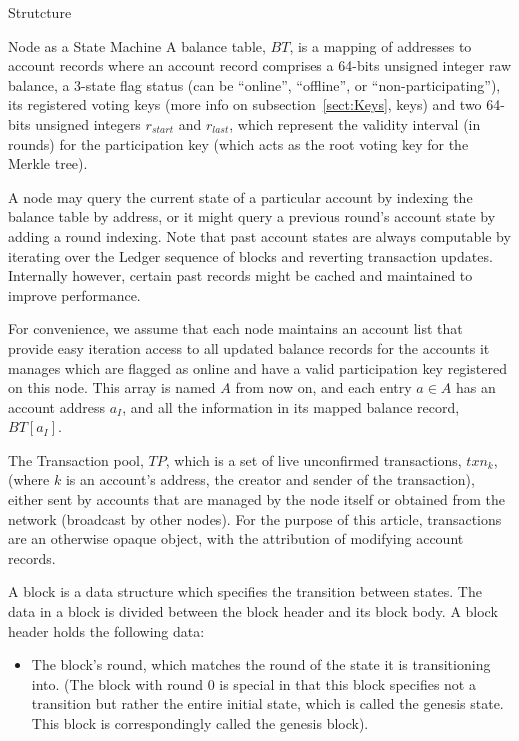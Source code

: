 \documentclass[10pt,a4paper]{article}
\begin{document}
\begin{section}{Strutcture}
\begin{subsection}{Node as a State Machine}
A {\sf balance table}, $BT$, is a mapping of addresses to 
account records where an {\sf account record} comprises 
 a 64-bits unsigned integer raw balance, 
 a 3-state flag status (can be ``online'', ``offline'', or ``non-participating''),
 its registered voting keys (more info on subsection~\ref{sect:Keys}, keys) and 
 two 64-bits unsigned integers $r_{start}$ and $r_{last}$, which represent the 
   validity interval (in rounds)
   for the participation key (which acts as the root voting key for the Merkle 
   tree).

A node may query the current state of a particular account by indexing the balance 
table by address, or it might query a previous round's account state by adding a 
round indexing. 
Note that past account states are always computable by iterating over the Ledger
sequence of blocks and reverting transaction updates. Internally however, certain
past records might be cached and maintained to improve performance.

For convenience, we assume that each node maintains an account list that provide 
easy iteration access to all updated balance records for the accounts it manages 
which are flagged as online and have a valid participation key registered on this
node. 
This array is named $A$ from now on, and each entry $a\in A$ has an account address 
$a_I$, and all the information in its mapped balance record, $BT[a_I]$.

The Transaction pool, $TP$, which is a set of live unconfirmed transactions, $txn_k$, (where 
$k$ is an account's address, the creator and sender of the transaction), either
sent by accounts that are managed by the node itself or obtained from the network 
(broadcast by other nodes).
For the purpose of this article, transactions are an otherwise opaque object, with the 
attribution of modifying account records.

A {\sf block} is a data structure which specifies the transition between states.
The data in a block is divided between the block header and its block body.
A block header holds the following data:
\begin{itemize}
    \item
    The block's round, which matches the round of the state it is transitioning
    into. (The block with round 0 is special in that this block specifies not
    a transition but rather the entire initial state, which is called the genesis
    state. This block is correspondingly called the genesis block).
    

\end{itemize}
\end{subsection}
\end{section}
\end{document}
